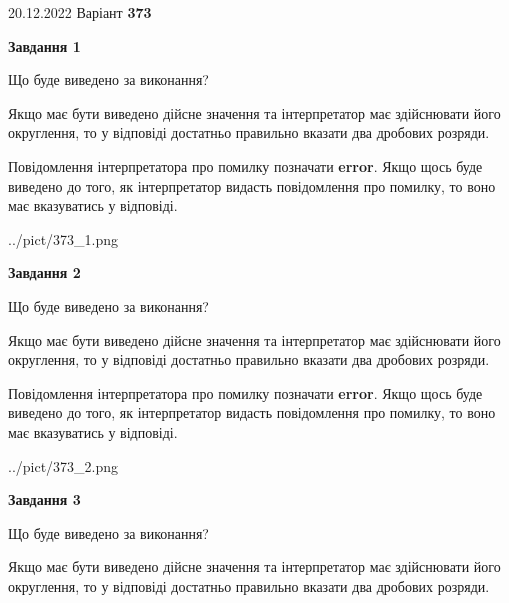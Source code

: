 \documentclass[12pt, ukrainian]{article}
\begin{document}
{20.12.2022 Варіант \No \textbf { 373 }\par}
{
\begin {Large}

{\begin {center}\textbf{Завдання 1}\end {center}}\par
Що буде виведено за виконання? \par

Якщо має бути виведено дійсне значення та інтерпретатор має здійснювати його округлення, 
то у відповіді достатньо правильно вказати два дробових розряди.

Повідомлення інтерпретатора про помилку позначати \textbf{error}.
Якщо щось буде виведено до того, як інтерпретатор видасть повідомлення про помилку, 
то воно має вказуватись у відповіді. \par

\begin{center}
	{../pict/373_1.png}
\end{center}
\newpage

{\begin {center}\textbf{Завдання 2}\end {center}}\par
Що буде виведено за виконання? \par

Якщо має бути виведено дійсне значення та інтерпретатор має здійснювати його округлення, 
то у відповіді достатньо правильно вказати два дробових розряди.

Повідомлення інтерпретатора про помилку позначати \textbf{error}.
Якщо щось буде виведено до того, як інтерпретатор видасть повідомлення про помилку, 
то воно має вказуватись у відповіді. \par

\begin{center}
	{../pict/373_2.png}
\end{center}
\newpage

{\begin {center}\textbf{Завдання 3}\end {center}}\par
Що буде виведено за виконання? \par

Якщо має бути виведено дійсне значення та інтерпретатор має здійснювати його округлення, 
то у відповіді достатньо правильно вказати два дробових розряди.


\end{Large}}
\end{document}
